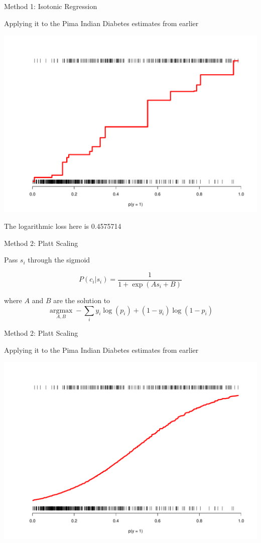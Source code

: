 \documentclass[ignorenonframetext,]{beamer}
\begin{document}
\begin{frame}{Method 1: Isotonic Regression}

Applying it to the Pima Indian Diabetes estimates from earlier

\includegraphics{presentation_files/figure-beamer/unnamed-chunk-6-1.pdf}

The logarithmic loss here is 0.4575714

\end{frame}

\begin{frame}{Method 2: Platt Scaling}

Pass \(s_i\) through the sigmoid

\[P(c_i | s_i) = \frac{1}{1 + \exp(As_i + B)}\]

where \(A\) and \(B\) are the solution to
\[\underset{A, B}{\operatorname{argmax}} - \sum\limits_{i} y_i \log(p_i) + (1 - y_i) \log(1- p_i)\]

\end{frame}

\begin{frame}{Method 2: Platt Scaling}

Applying it to the Pima Indian Diabetes estimates from earlier

\includegraphics{presentation_files/figure-beamer/unnamed-chunk-7-1.pdf}

\end{frame}
\end{document}
